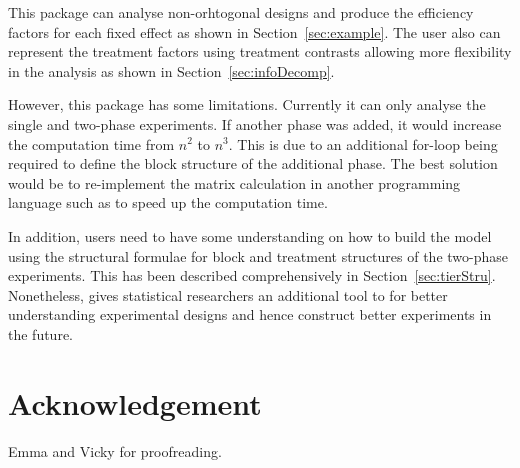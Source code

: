 \documentclass[article]{jss}
\begin{document}
This package can analyse non-orhtogonal designs and produce the efficiency factors for each fixed effect as shown in Section~\ref{sec:example}. The user also can represent the treatment factors using treatment contrasts allowing more flexibility in the analysis as shown in Section~\ref{sec:infoDecomp}.

However, this package has some limitations. Currently it can only analyse the single and two-phase experiments. If another phase was added, it would increase the computation time from $n^2$ to $n^3$. This is due to an additional for-loop being required to define the block structure of the additional phase. The best solution would be to re-implement the matrix calculation in another programming language such as  to speed up the computation time.

In addition, users need to have some understanding on how to build the model using the structural formulae for block and treatment structures of the two-phase experiments. This has been described comprehensively in Section~\ref{sec:tierStru}. Nonetheless,  gives statistical researchers an additional tool to for better understanding experimental designs and hence construct better experiments in the future.

\section*{Acknowledgement}
Emma and Vicky for proofreading.


\end{document}
